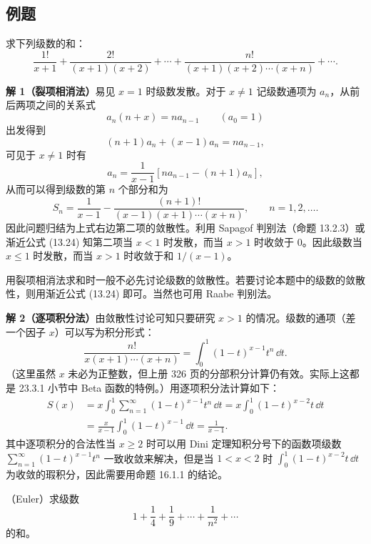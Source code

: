 \subsection{例题}

\begin{xexample}[16.2.1]
求下列级数的和：
\[
  \frac{1!}{x+1}+\frac{2!}{(x+1)(x+2)}+\cdots
  +\frac{n!}{(x+1)(x+2)\cdots(x+n)}+\cdots.
\]
\end{xexample}

\begin{xsolution}
\textbf{解 1（裂项相消法）}\quad 易见 $x=1$ 时级数发散。对于 $x\ne1$ 记级数通项为 $a_n$，从前后两项之间的关系式
\[
  a_n(n+x)=na_{n-1}\qquad(a_0=1)
\]
出发得到
\[
  (n+1)a_n+(x-1)a_n=na_{n-1},
\]
可见于 $x\ne1$ 时有
\[
  a_n=\frac1{x-1}[na_{n-1}-(n+1)a_n],
\]
从而可以得到级数的第 $n$ 个部分和为
\[
  S_n=\frac1{x-1}-\frac{(n+1)!}{(x-1)(x+1)\cdots(x+n)},
  \qquad n=1,2,\ldots.
\]
因此问题归结为上式右边第二项的敛散性。利用 Sapagof 判别法（命题 13.2.3）或渐近公式 (13.24) 知第二项当 $x<1$ 时发散，而当 $x>1$ 时收敛于 0。因此级数当 $x\leqslant1$ 时发散，而当 $x>1$ 时收敛于和 $1/(x-1)$。

\begin{xremark}
用裂项相消法求和时一般不必先讨论级数的敛散性。若要讨论本题中的级数的敛散性，则用渐近公式 (13.24) 即可。当然也可用 Raabe 判别法。
\end{xremark}

\textbf{解 2（逐项积分法）}\quad 由敛散性讨论可知只要研究 $x>1$ 的情况。级数的通项（差一个因子 $x$）可以写为积分形式：
\[
  \frac{n!}{x(x+1)\cdots(x+n)}=\int_0^1(1-t)^{x-1}t^n\,\dd t.
\]
（这里虽然 $x$ 未必为正整数，但上册 326 页的分部积分计算仍有效。实际上这都是 23.3.1 小节中 Beta 函数的特例。）用逐项积分法计算如下：
\[
\begin{aligned}
  S(x)&=x\int_0^1\sum_{n=1}^{\infty}(1-t)^{x-1}t^n\,\dd t
      =x\int_0^1(1-t)^{x-2}t\,\dd t\\
  &=\frac{x}{x-1}\int_0^1(1-t)^{x-1}\,\dd t
      =\frac1{x-1}.
\end{aligned}
\]
其中逐项积分的合法性当 $x\geqslant2$ 时可以用 Dini 定理知积分号下的函数项级数 $\sum_{n=1}^{\infty}(1-t)^{x-1}t^n$ 一致收敛来解决，但是当 $1<x<2$ 时 $\int_0^1(1-t)^{x-2}t\,\dd t$ 为收敛的瑕积分，因此需要用命题 16.1.1 的结论。
\end{xsolution}

\begin{xexample}[16.2.2]
（Euler）求级数
\[
  1+\frac14+\frac19+\cdots+\frac1{n^2}+\cdots
\]
的和。
\end{xexample}

